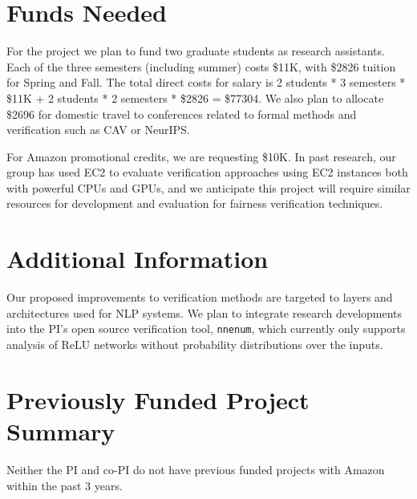 \documentclass[11pt]{article}
\begin{document}
\section*{Funds Needed}
For the project we plan to fund two graduate students as research assistants. %
Each of the three semesters (including summer) costs \$11K, with \$2826 tuition for Spring and Fall. The total direct costs for salary is 2 students * 3 semesters * \$11K + 2 students * 2 semesters * \$2826 = \$77304. We also plan to allocate \$2696 for domestic travel to conferences related to formal methods and verification such as CAV or NeurIPS.

For Amazon promotional credits, we are requesting \$10K. In past research, our group has used EC2 to evaluate verification approaches using EC2 instances both with powerful CPUs and GPUs, and we anticipate this project will require similar resources for development and evaluation for fairness verification techniques.

\section*{Additional Information}

Our proposed improvements to verification methods are targeted to layers and architectures used for NLP systems.
%
We plan to integrate research developments into the PI's open source verification tool, \texttt{nnenum}, which currently only supports analysis of ReLU networks without probability distributions over the inputs.





\appendix

\clearpage
\thispagestyle{empty}




\clearpage
\section*{Previously Funded Project Summary}
Neither the PI and co-PI do not have previous funded projects with Amazon within the past 3 years.

\end{document}
